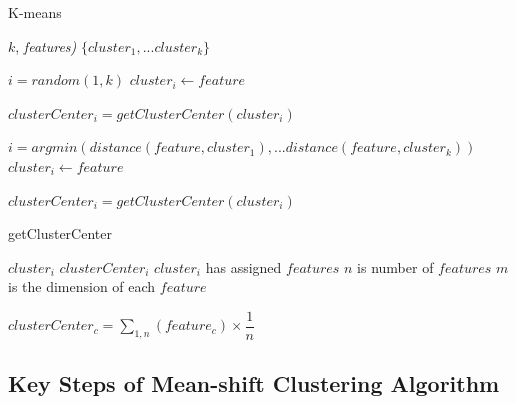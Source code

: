\documentclass[12pt]{article}
\begin{document}
\begin{algorithm}
	\caption{K-means}
	\label{alg:kmeans}
	\begin{algorithmic}[1]
	\Require $k$, \textit{features)}
	\Ensure $\{cluster_{1},...cluster_{k}\}$
	
		
		\State $i = random(1, k)$
		\State $cluster_{i} \gets feature$
	
	\EndFor	
	
		\State $clusterCenter_{i} = getClusterCenter(cluster_{i})$	
	\EndFor	
	

			\State $i = argmin(distance(feature, cluster_{1}),... distance(feature, cluster_{k}))$
			\State $cluster_{i} \gets feature$
		\EndFor	
		
			\State $clusterCenter_{i} = getClusterCenter(cluster_{i})$	
		\EndFor	
	
	\EndWhile

	\State {}
	
	\EndFunction
	\end{algorithmic}

\end{algorithm}

\begin{algorithm}
	\caption{getClusterCenter}
	\label{alg:getCenter}
	\begin{algorithmic}[1]
	\Require $cluster_{i}$
	\Ensure $clusterCenter_{i}$
	\State $cluster_{i}$ has assigned $features$
	\State $n$ is number of $features$
	\State $m$ is the dimension of each $feature$


		\State $clusterCenter_{c} = \sum_{1, n}(feature_{c})\times\dfrac{1}{n}$	
	
	\EndFor	
	
	\State {}
	\EndFunction
	
	\end{algorithmic}
\end{algorithm}

\subsection{Key Steps of Mean-shift Clustering Algorithm}
\end{document}
